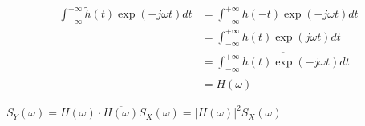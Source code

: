 \documentclass[a4paper]{article}
\begin{document}
$$\begin{aligned}
  \int_{-\infty}^{+\infty}\tilde h(t)\exp(-j\omega t) dt
  &=\int_{-\infty}^{+\infty}h(-t)\exp(-j\omega t) dt \\
  &=\int_{-\infty}^{+\infty}h(t)\exp(j\omega t) dt \\
  &=\overline{\int_{-\infty}^{+\infty}h(t)\exp(-j\omega t) dt} \\
  &=\overline{H(\omega)}
\end{aligned}$$

$S_Y(\omega)=H(\omega)\cdot\overline{H(\omega)}S_X(\omega)=|H(\omega)|^2S_X(\omega)$
\end{document}
